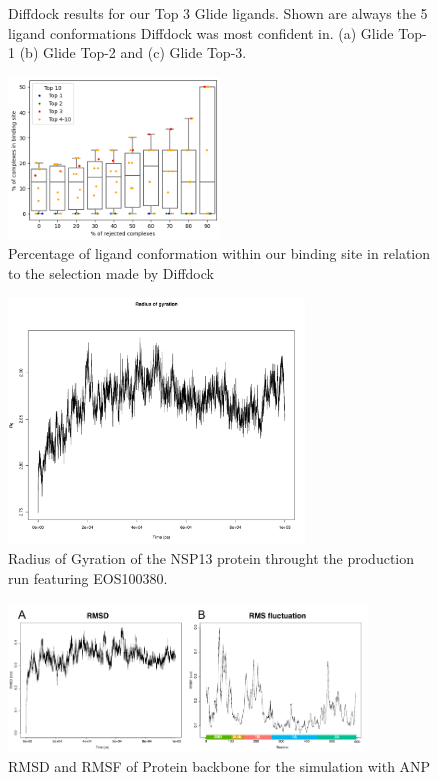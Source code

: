 \documentclass[11pt, letterpaper, titlepage]{article}
\begin{document}
\begin{figure}[h]
	\caption{Diffdock results for our Top 3 Glide ligands. Shown are always the 5 ligand conformations Diffdock was most confident in. (a) Glide Top-1 (b) Glide Top-2 and (c) Glide Top-3.}\label{pymol_Top3}
\end{figure}

\begin{figure}[h]
	\begin{center}
		\includegraphics[width=0.5\textwidth]{diffdock_percentage_graph}
	\end{center}
	\caption{Percentage of ligand conformation within our binding site in relation to the selection made by Diffdock}\label{Diffdock_plot}
\end{figure}


\begin{figure}[h]
  \begin{center}
    \includegraphics[width=0.7\textwidth]{gyration_protein.pdf}
  \end{center}
  \caption{Radius of Gyration of the NSP13 protein throught the production run featuring EOS100380.}\label{gyr}
\end{figure}

\begin{figure}[h]
  \begin{center}
    \includegraphics[width=0.85\textwidth]{rms_ANP.pdf}
  \end{center}
  \caption{RMSD and RMSF of Protein backbone for the simulation with ANP}\label{anp}
\end{figure}
\end{document}
